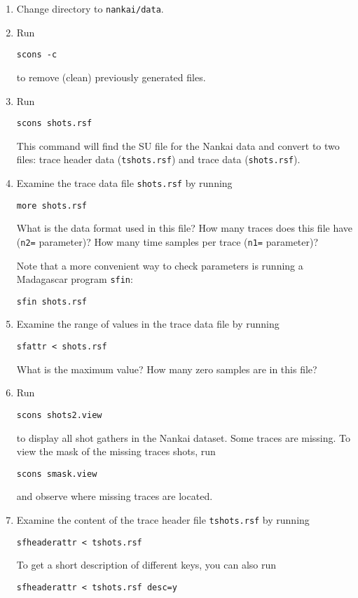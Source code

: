 \begin{enumerate}          
\item Change directory to \texttt{nankai/data}.
\item Run
\begin{verbatim}
scons -c
\end{verbatim}
to remove (clean) previously generated files.
\item Run
\begin{verbatim}
scons shots.rsf
\end{verbatim}
This command will find the SU file for the Nankai data and convert to two files: trace header 
data (\texttt{tshots.rsf}) and trace data (\texttt{shots.rsf}).
\item Examine the trace data file \texttt{shots.rsf} by running
\begin{verbatim}
more shots.rsf
\end{verbatim}
What is the data format used in this file? How many traces does this file have (\texttt{n2=} parameter)? 
How many time samples per trace (\texttt{n1=} parameter)?

\answer{
}       

Note that a more convenient way to check parameters is running a Madagascar program \texttt{sfin}:
\begin{verbatim}
sfin shots.rsf
\end{verbatim}
\item Examine the range of values in the trace data file by running
\begin{verbatim}
sfattr < shots.rsf
\end{verbatim}
What is the maximum value? How many zero samples are in this file?

\answer{
}

\item Run
\begin{verbatim}
scons shots2.view 
\end{verbatim}
to display all shot gathers in the Nankai dataset. Some traces are missing. 
To view the mask of the missing traces shots, run 
\begin{verbatim}
scons smask.view 
\end{verbatim}
and observe where missing traces are located.      

\item Examine the content of the trace header file \texttt{tshots.rsf} by running
\begin{verbatim}
sfheaderattr < tshots.rsf
\end{verbatim}
To get a short description of different keys, you can also run
\begin{verbatim}
sfheaderattr < tshots.rsf desc=y
\end{verbatim}      


\end{enumerate}

